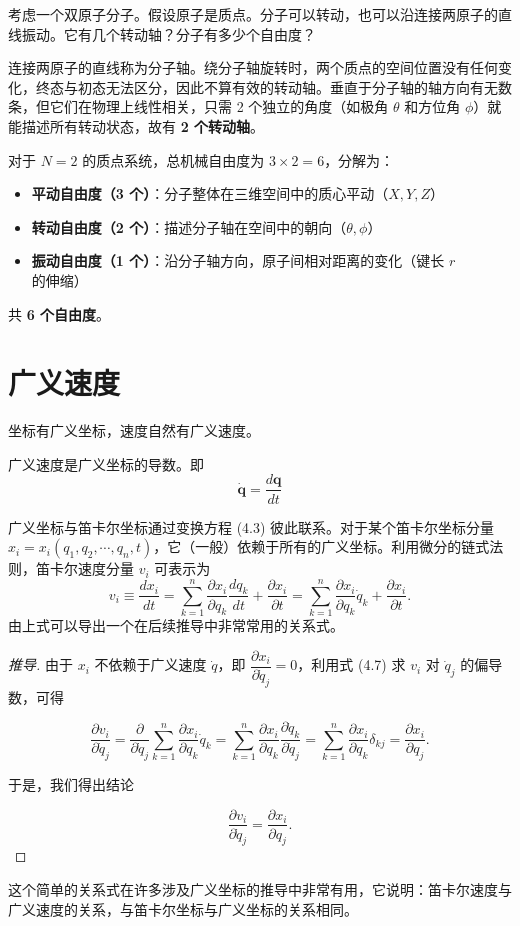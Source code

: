 \begin{example}[例题 4.2（双原子分子的自由度）]
考虑一个双原子分子。假设原子是质点。分子可以转动，也可以沿连接两原子的直线振动。它有几个转动轴？分子有多少个自由度？
\end{example}
\begin{solution}
连接两原子的直线称为分子轴。绕分子轴旋转时，两个质点的空间位置没有任何变化，终态与初态无法区分，因此不算有效的转动轴。垂直于分子轴的轴方向有无数条，但它们在物理上线性相关，只需 2 个独立的角度（如极角 $\theta$ 和方位角 $\phi$）就能描述所有转动状态，故有 \textbf{2 个转动轴}。

对于 $N=2$ 的质点系统，总机械自由度为 $3\times2=6$，分解为：

\begin{itemize}

\item \textbf{平动自由度（3 个）}：分子整体在三维空间中的质心平动（$X, Y, Z$）

\item \textbf{转动自由度（2 个）}：描述分子轴在空间中的朝向（$\theta, \phi$）

\item \textbf{振动自由度（1 个）}：沿分子轴方向，原子间相对距离的变化（键长 $r$ 的伸缩）

\end{itemize}

共 \textbf{6 个自由度}。
\end{solution}
\section{广义速度}
坐标有广义坐标，速度自然有广义速度。
\begin{definition}[广义速度]
广义速度是广义坐标的导数。即$$\dot{\boldsymbol{q}} = \frac{d\boldsymbol{q}}{dt}$$
\end{definition}
广义坐标与笛卡尔坐标通过变换方程 (4.3) 彼此联系。对于某个笛卡尔坐标分量 $x_i = x_i(q_1, q_2, \cdots, q_n, t)$，它（一般）依赖于所有的广义坐标。利用微分的链式法则，笛卡尔速度分量 $v_i$ 可表示为
\[
v_i \equiv \frac{dx_i}{dt} = \sum_{k=1}^{n}\frac{\partial x_i}{\partial q_k}\frac{dq_k}{dt} + \frac{\partial x_i}{\partial t} = \sum_{k=1}^{n}\frac{\partial x_i}{\partial q_k}\dot{q}_k + \frac{\partial x_i}{\partial t}.
\]
由上式可以导出一个在后续推导中非常常用的关系式。
\begin{proof}[推导]
由于 $x_i$ 不依赖于广义速度 $\dot{q}$，即 $\dfrac{\partial x_i}{\partial \dot{q}_j} = 0$，利用式 (4.7) 求 $v_i$ 对 $\dot{q}_j$ 的偏导数，可得

\[
\frac{\partial v_i}{\partial \dot{q}_j} = \frac{\partial}{\partial \dot{q}_j}\sum_{k=1}^{n}\frac{\partial x_i}{\partial q_k}\dot{q}_k = \sum_{k=1}^{n}\frac{\partial x_i}{\partial q_k}\frac{\partial \dot{q}_k}{\partial \dot{q}_j} = \sum_{k=1}^{n}\frac{\partial x_i}{\partial q_k}\delta_{kj} = \frac{\partial x_i}{\partial q_j}.
\]

于是，我们得出结论

\[
\frac{\partial v_i}{\partial \dot{q}_j} = \frac{\partial x_i}{\partial q_j}.
\]
\end{proof}
这个简单的关系式在许多涉及广义坐标的推导中非常有用，它说明：笛卡尔速度与广义速度的关系，与笛卡尔坐标与广义坐标的关系相同。
